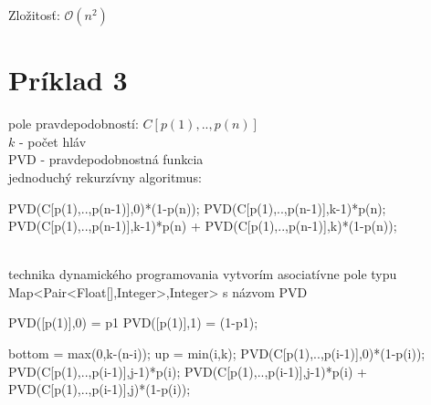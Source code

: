 \documentclass[paper=a4, fontsize=11pt]{scrartcl} %
\numberwithin{equation}{section} %
\numberwithin{figure}{section} %
\numberwithin{table}{section} %
\begin{document}
Zložitosť:
$\mathcal{O}(n^2)$

\pagebreak


\section*{Príklad 3}

pole pravdepodobností: $C[p(1),..,p(n)]$\\
$k$ - počet hláv\\
PVD - pravdepodobnostná funkcia\\

jednoduchý rekurzívny algoritmus: \\

\begin{algorithmic}[1]
            \State \Return PVD(C[p(1),..,p(n-1)],0)*(1-p(n));
        \EndIf
            \State \Return PVD(C[p(1),..,p(n-1)],k-1)*p(n);
        \EndIf
        \State \Return PVD(C[p(1),..,p(n-1)],k-1)*p(n) + PVD(C[p(1),..,p(n-1)],k)*(1-p(n));
    \EndFunction
\end{algorithmic}
\ \\

technika dynamického programovania
vytvorím asociatívne pole typu Map<Pair<Float[],Integer>,Integer> s názvom PVD\\

\begin{algorithmic}[1]
    \State PVD([p(1)],0) = p1
    \State PVD([p(1)],1) = (1-p1);

        \State bottom = max(0,k-(n-i));
        \State up = min(i,k);
                \State PVD(C[p(1),..,p(i-1)],0)*(1-p(i));
            \Else {}
                \State PVD(C[p(1),..,p(i-1)],j-1)*p(i);
            \Else 
                \State PVD(C[p(1),..,p(i-1)],j-1)*p(i) + PVD(C[p(1),..,p(i-1)],j)*(1-p(i));
            \EndIf \EndIf
        \EndFor
    \EndFor
\end{algorithmic}
\ \\

\pagebreak

\end{document}
